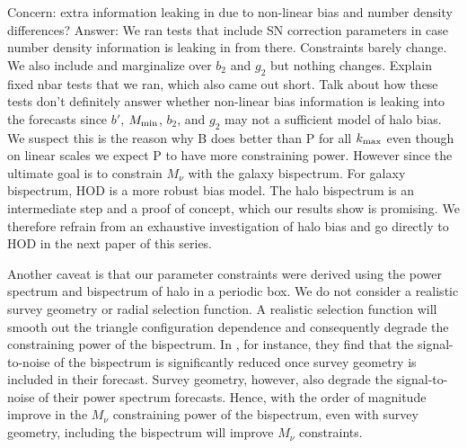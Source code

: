 \documentclass[12pt, letterpaper, preprint]{aastex62}
\newcommand{\smnu}{M_\nu}
\begin{document}
Concern: extra information leaking in due to non-linear bias and number density differences? 
Answer: We ran tests that include SN correction parameters in case number density 
information is leaking in from there. Constraints barely change. We also include and marginalize 
over $b_2$ and $g_2$ but nothing changes. Explain fixed nbar tests that we ran, which also came 
out short. Talk about how these tests don't definitely answer whether non-linear bias information
is leaking into the forecasts since $b'$, $M_{\rm min}$, $b_2$, and $g_2$ may not a sufficient
model of halo bias. We suspect this is the reason why B does better than P for all $k_{\rm max}$ 
even though on linear scales we expect P to have more constraining power. 
However since the ultimate goal is to constrain $\smnu$ with the galaxy 
bispectrum.  For galaxy bispectrum, HOD is a more robust bias model. The halo bispectrum is an
intermediate step and a proof of concept, which our results show is promising. We therefore 
refrain from an exhaustive investigation of halo bias and go directly to HOD in the next paper 
of this series.

Another caveat is that our parameter constraints were derived using the power 
spectrum and bispectrum of halo in a periodic box. We do not consider a 
realistic survey geometry or radial selection function. A realistic selection 
function will smooth out the triangle configuration dependence and consequently 
degrade the constraining power of the bispectrum. In \cite{sefusatti2005}, for 
instance, they find that the signal-to-noise of the bispectrum is significantly 
reduced once survey geometry is included in their forecast. Survey geometry, 
however, also degrade the signal-to-noise of their power spectrum forecasts. 
Hence, with the order of magnitude improve in the $\smnu$ constraining power 
of the bispectrum, even with survey geometry, including the bispectrum will 
improve $\smnu$ constraints. 
\end{document}
